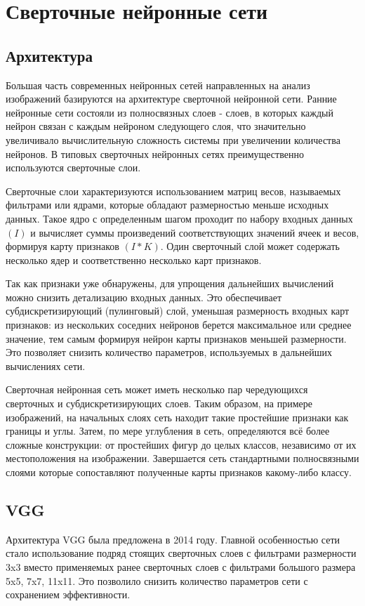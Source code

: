 \section{Сверточные нейронные сети} \label{CNN}

\subsection{Архитектура}

Большая часть современных нейронных сетей направленных на анализ изображений базируются на архитектуре сверточной нейронной сети.
Ранние нейронные сети состояли из полносвязных слоев - слоев, в которых каждый нейрон связан с каждым нейроном следующего слоя, что значительно увеличивало вычислительную сложность системы при увеличении количества нейронов. 
В типовых сверточных нейронных сетях преимущественно используются сверточные слои. 

Сверточные слои характеризуются использованием матриц весов, называемых фильтрами или ядрами, которые обладают размерностью меньше исходных данных. Такое ядро с определенным шагом проходит по набору входных данных $(I)$ и вычисляет суммы произведений соответствующих значений ячеек и весов, формируя карту признаков $(I * K)$. Один сверточный слой может содержать несколько ядер и соответственно несколько карт признаков.



Так как признаки уже обнаружены, для упрощения дальнейших вычислений можно снизить детализацию входных данных. Это обеспечивает субдискретизирующий (пулинговый) слой, уменьшая размерность входных карт признаков: из нескольких соседних нейронов берется максимальное или среднее значение, тем самым формируя нейрон карты признаков меньшей размерности. Это позволяет снизить количество параметров, используемых в дальнейших вычислениях сети. 



Сверточная нейронная сеть может иметь несколько пар чередующихся сверточных и субдискретизирующих слоев. 
Таким образом, на примере изображений, на начальных слоях сеть находит такие простейшие признаки как границы и углы. Затем, по мере углубления в сеть, определяются всё более сложные конструкции: от простейших фигур до целых классов, независимо от их местоположения на изображении. Завершается сеть стандартными полносвязными слоями которые сопоставляют полученные карты признаков какому-либо классу.  

\subsection{VGG}
Архитектура VGG была предложена в 2014 году\cite{simonyan2014convolutional}. Главной особенностью сети стало использование подряд стоящих сверточных слоев с фильтрами размерности 3x3 вместо применяемых ранее сверточных слоев с фильтрами большого размера 5x5, 7x7, 11x11. Это позволило снизить количество параметров сети с сохранением эффективности.

